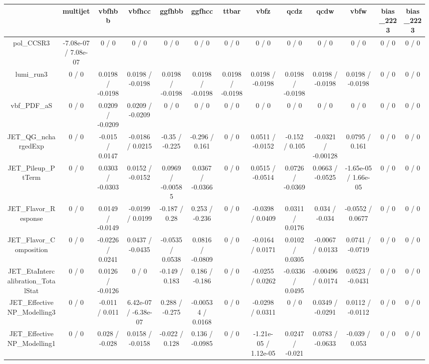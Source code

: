 \documentclass[10pt]{article}
\begin{document}
\begin{table}[htbp]
\begin{center}
\begin{tabular}{|c|c|c|c|c|c|c|c|c|c|c|c|c|}
\hline 
      & multijet      & vbfhbb      & vbfhcc      & ggfhbb      & ggfhcc      & ttbar      & vbfz      & qcdz      & qcdw      & vbfw      & bias_2223      & bias_2223 \\ 
\hline 
  pol_CCSR3 & -7.08e-07 / 7.08e-07 & 0 / 0 & 0 / 0 & 0 / 0 & 0 / 0 & 0 / 0 & 0 / 0 & 0 / 0 & 0 / 0 & 0 / 0 & 0 / 0 & 0 / 0 \\ 
  lumi_run3 & 0 / 0 & 0.0198 / -0.0198 & 0.0198 / -0.0198 & 0.0198 / -0.0198 & 0.0198 / -0.0198 & 0.0198 / -0.0198 & 0.0198 / -0.0198 & 0.0198 / -0.0198 & 0.0198 / -0.0198 & 0.0198 / -0.0198 & 0 / 0 & 0 / 0 \\ 
  vbf_PDF_aS & 0 / 0 & 0.0209 / -0.0209 & 0.0209 / -0.0209 & 0 / 0 & 0 / 0 & 0 / 0 & 0 / 0 & 0 / 0 & 0 / 0 & 0 / 0 & 0 / 0 & 0 / 0 \\ 
  JET_QG_nchargedExp & 0 / 0 & -0.015 / 0.0147 & -0.0186 / 0.0215 & -0.35 / -0.225 & -0.296 / 0.161 & 0 / 0 & 0.0511 / -0.0152 & -0.152 / 0.105 & -0.0321 / -0.00128 & 0.0795 / 0.161 & 0 / 0 & 0 / 0 \\ 
  JET_Pileup_PtTerm & 0 / 0 & 0.0303 / -0.0303 & 0.0152 / -0.0152 & 0.0969 / -0.00585 & 0.0367 / -0.0366 & 0 / 0 & 0.0515 / -0.0514 & 0.0726 / -0.0369 & 0.0663 / -0.0525 & -1.65e-05 / 1.66e-05 & 0 / 0 & 0 / 0 \\ 
  JET_Flavor_Response & 0 / 0 & 0.0149 / -0.0149 & -0.0199 / 0.0199 & -0.187 / 0.28 & 0.253 / -0.236 & 0 / 0 & -0.0398 / 0.0409 & 0.0311 / 0.0176 & 0.034 / -0.034 & -0.0552 / 0.0677 & 0 / 0 & 0 / 0 \\ 
  JET_Flavor_Composition & 0 / 0 & -0.0226 / 0.0241 & 0.0437 / -0.0435 & -0.0535 / 0.0538 & 0.0816 / -0.0809 & 0 / 0 & -0.0164 / 0.0171 & 0.0102 / 0.0305 & -0.0067 / 0.0133 & 0.0741 / -0.0719 & 0 / 0 & 0 / 0 \\ 
  JET_EtaIntercalibration_TotalStat & 0 / 0 & 0.0126 / -0.0126 & 0 / 0 & -0.149 / 0.183 & 0.186 / -0.186 & 0 / 0 & -0.0255 / 0.0262 & -0.0336 / 0.0495 & -0.00496 / 0.0174 & 0.0523 / -0.0431 & 0 / 0 & 0 / 0 \\ 
  JET_EffectiveNP_Modelling3 & 0 / 0 & -0.011 / 0.011 & 6.42e-07 / -6.38e-07 & 0.288 / -0.275 & -0.00534 / 0.0168 & 0 / 0 & -0.0298 / 0.0311 & 0 / 0 & 0.0349 / -0.0291 & 0.0112 / -0.0112 & 0 / 0 & 0 / 0 \\ 
  JET_EffectiveNP_Modelling1 & 0 / 0 & 0.028 / -0.028 & 0.0158 / -0.0158 & -0.022 / 0.128 & 0.136 / -0.0985 & 0 / 0 & -1.21e-05 / 1.12e-05 & 0.0247 / -0.021 & 0.0783 / -0.0633 & -0.039 / 0.053 & 0 / 0 & 0 / 0 \\ 

\end{tabular}
\end{center}
\end{table}
\end{document}
